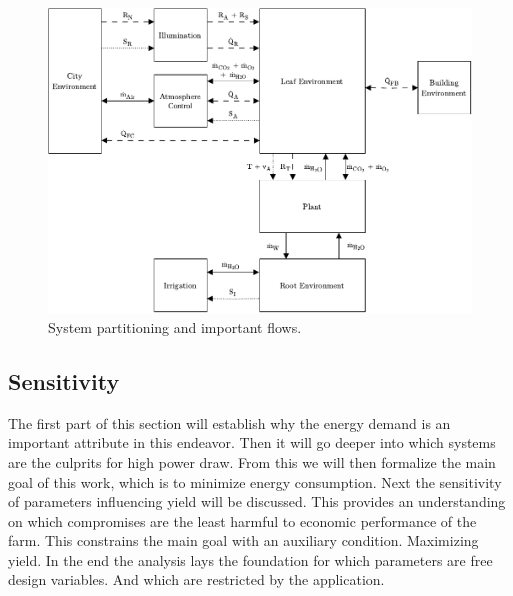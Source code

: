 \begin{figure}[htbp]
  \centering
  \includegraphics[width=\textwidth]{img/system_analysis/context.pdf}
  \caption{System partitioning and important flows.}
  \label{fig:context}
\end{figure}

\subsection{Sensitivity}
The first part of this section will establish why the energy demand is an important attribute in this endeavor.
Then it will go deeper into which systems are the culprits for high power draw.
From this we will then formalize the main goal of this work, which is to minimize energy consumption.
Next the sensitivity of parameters influencing yield will be discussed.
This provides an understanding on which compromises are the least harmful to economic performance of the farm.
This constrains the main goal with an auxiliary condition.
Maximizing yield.
In the end the analysis lays the foundation for which parameters are free design variables.
And which are restricted by the application.




